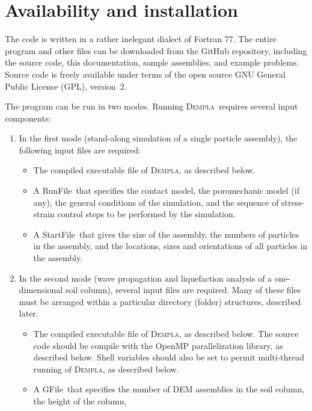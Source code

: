 \documentclass[letterpaper,11pt]{article}
\newcommand{\Dempla}{\textsc{Dempla}}
\newcommand{\RunFile}{\textsf{RunFile}}
\newcommand{\StartFile}{\textsf{StartFile}}
\newcommand{\GFile}{\textsf{GFile}}
\begin{document}
\section{Availability and installation}\label{sec:installation}
The code is written in a rather inelegant dialect of Fortran 77.
The entire program and other files can be downloaded from the
GitHub repository,
including the source code, this documentation,
sample assemblies, and example problems.
Source code is freely available under terms of the open source GNU General
Public License (GPL), version~2.
\par
The program can be run in two modes.
Running \Dempla\ requires several input components:
\begin{enumerate}
	\item
	  In the first mode
	  (stand-along simulation of a single particle assembly),
	  the following input files are required:
	  \begin{itemize}
	     \item
	       The compiled executable file of \Dempla,
	       as described below.
	     \item
	       A \RunFile\ that specifies the contact model,
	       the poromechanic model (if any),
	       the general conditions of the simulation,
	       and the sequence of stress-strain control steps
	       to be performed by the simulation.
	     \item
	       A \StartFile\ that gives the size of the assembly,
	       the numbers of particles in the assembly,
	       and the locations, sizes and orientations of
	       all particles in the assembly.
	  \end{itemize}
    \item
      In the second mode (wave propagation and liquefaction
      analysis of a one-dimensional soil column),
      several input files are required.
      Many of these files must be arranged within a particular
      directory (folder) structures, described later.
      \begin{itemize}
      	\item
          The compiled executable file of \Dempla, as described below.
          The source code should be compile with the OpenMP parallelization
          library, as described below.
          Shell variables should also be set to permit multi-thread
          running of \Dempla, as described below.
        \item
          A \GFile\ that specifies the number of DEM assemblies
          in the soil column, the height of the column,

\end{itemize}
\end{enumerate}
\end{document}
